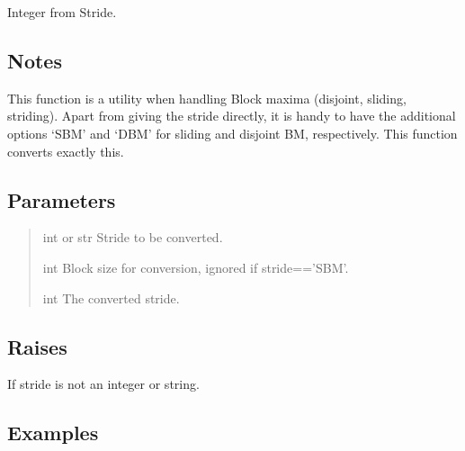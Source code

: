 \documentclass[a4paper,11pt,openany,english]{sphinxmanual}
\begin{document}
\begin{fulllineitems}
\label{\detokenize{api_misc:xtremes.miscellaneous.stride2int}}
\pysigstartsignatures
{}
\pysigstopsignatures
\sphinxAtStartPar
Integer from Stride.


\subsection{Notes}
\label{\detokenize{api_misc:id37}}
\sphinxAtStartPar
This function is a utility when handling Block maxima (disjoint, sliding, striding).
Apart from giving the stride directly, it is handy to have the additional options
‘SBM’ and ‘DBM’ for sliding and disjoint BM, respectively. This function converts exactly this.


\subsection{Parameters}
\label{\detokenize{api_misc:id38}}\begin{quote}\begin{description}
\sphinxAtStartPar
int or str
Stride to be converted.

\sphinxAtStartPar
int
Block size for conversion, ignored if stride==’SBM’.

\sphinxAtStartPar
int
The converted stride.

\end{description}\end{quote}


\subsection{Raises}
\label{\detokenize{api_misc:id39}}\begin{description}
\sphinxAtStartPar
If stride is not an integer or string.

\end{description}


\subsection{Examples}
\label{\detokenize{api_misc:id40}}
\begin{sphinxVerbatim}[commandchars=\\\{\}]
 
 
 
\end{sphinxVerbatim}


\end{fulllineitems}
\end{document}
